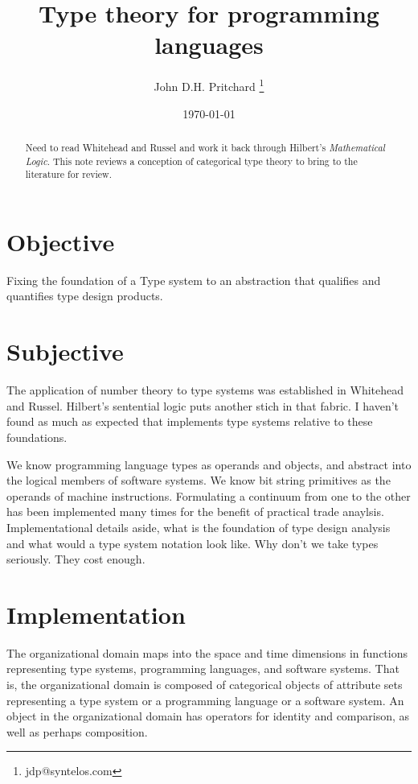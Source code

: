 \documentclass{article}
\begin{document}
\title{Type theory for programming languages}

\author{John D.H. Pritchard \thanks{jdp@syntelos.com}}

\date{\today}

\maketitle

\begin{abstract}
Need to read Whitehead and Russel and work it back through Hilbert's
{\it Mathematical Logic}.  This note reviews a conception of
categorical type theory to bring to the literature for review.
\end{abstract}


\section{Objective}

Fixing the foundation of a Type system to an abstraction that
qualifies and quantifies type design products.

\section{Subjective}

The application of number theory to type systems was established in
Whitehead and Russel.  Hilbert's sentential logic puts another stich
in that fabric.  I haven't found as much as expected that implements
type systems relative to these foundations.  

We know programming language types as operands and objects, and
abstract into the logical members of software systems.  We know bit
string primitives as the operands of machine instructions.
Formulating a continuum from one to the other has been implemented
many times for the benefit of practical trade anaylsis.
Implementational details aside, what is the foundation of type design
analysis and what would a type system notation look like.  Why don't
we take types seriously.  They cost enough.

\section{Implementation}

The organizational domain maps into the space and time dimensions in
functions representing type systems, programming languages, and
software systems.  That is, the organizational domain is composed of
categorical objects of attribute sets representing a type system or a
programming language or a software system.  An object in the
organizational domain has operators for identity and comparison, as
well as perhaps composition.  
\end{document}
